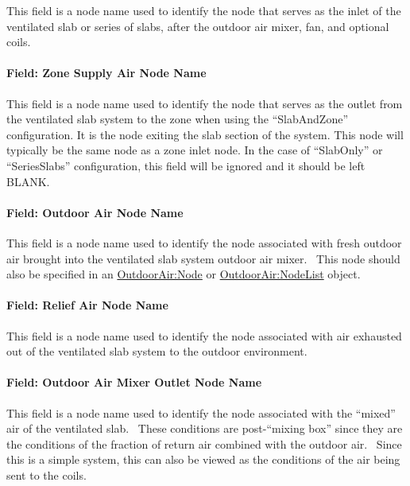 This field is a node name used to identify the node that serves as the inlet of the ventilated slab or series of slabs, after the outdoor air mixer, fan, and optional coils.

\paragraph{Field: Zone Supply Air Node Name}\label{field-zone-supply-air-node-name-000}

This field is a node name used to identify the node that serves as the outlet from the ventilated slab system to the zone when using the ``SlabAndZone'' configuration. It is the node exiting the slab section of the system. This node will typically be the same node as a zone inlet node. In the case of ``SlabOnly'' or ``SeriesSlabs'' configuration, this field will be ignored and it should be left BLANK.

\paragraph{Field: Outdoor Air Node Name}\label{field-outdoor-air-node-name}

This field is a node name used to identify the node associated with fresh outdoor air brought into the ventilated slab system outdoor air mixer.~ This node should also be specified in an \hyperref[outdoorairnode]{OutdoorAir:Node} or \hyperref[outdoorairnodelist]{\hyperref[outdoorairnode]{OutdoorAir:Node}List} object.

\paragraph{Field: Relief Air Node Name}\label{field-relief-air-node-name}

This field is a node name used to identify the node associated with air exhausted out of the ventilated slab system to the outdoor environment.

\paragraph{Field: Outdoor Air Mixer Outlet Node Name}\label{field-outdoor-air-mixer-outlet-node-name}

This field is a node name used to identify the node associated with the ``mixed'' air of the ventilated slab.~ These conditions are post-``mixing box'' since they are the conditions of the fraction of return air combined with the outdoor air.~ Since this is a simple system, this can also be viewed as the conditions of the air being sent to the coils.

